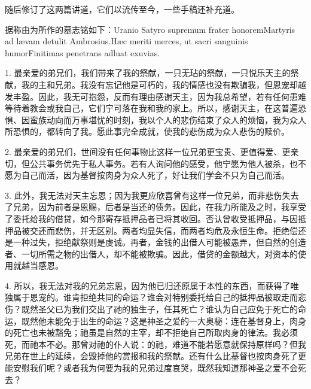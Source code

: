 随后修订了这两篇讲道，它们以流传至今，一些手稿还补充道。\par

据称由为所作的墓志铭如下：\newline{}Uranio Satyro supremum frater honorem\newline{}Martyris ad lævam detulit Ambrosius.\newline{}Hæc meriti merces, ut sacri sanguinis humor\newline{}Finitimas penetrans adluat exuvias.\par


1. 最亲爱的弟兄们，我们带来了我的祭献，一只无玷的祭献，一只悦乐天主的祭献，我的主和兄弟。我没有忘记他是可朽的，我的情感也没有欺骗我，但恩宠却越发丰盈。因此，我无可抱怨，反而有理由感谢天主，因为我总希望，若有任何患难等待着教会或我自己，它们宁可落在我和我的家上。所以，感谢天主，在这普遍恐惧、因蛮族动向而万事堪忧的时刻，我以个人的悲伤结束了众人的烦恼，我为众人所恐惧的，都转向了我。愿此事完全成就，使我的悲伤成为众人悲伤的赎价。\par

2. 最亲爱的弟兄们，世间没有任何事物比这样一位兄弟更宝贵、更值得爱、更亲切，但公共事务优先于私人事务。若有人询问他的感受，他宁愿为他人被杀，也不愿为自己而活，因为基督按肉身为众人死了，好让我们学会不只为自己而活。\par

3. 此外，我无法对天主忘恩；因为我更应欣喜曾有这样一位兄弟，而非悲伤失去了兄弟，因为前者是恩赐，后者是当还的债务。因此，在我力所能及之时，我享受了委托给我的借贷，如今那寄存抵押品者已将其收回。否认曾收受抵押品，与因抵押品被交还而悲伤，并无区别。两者均显失信，而两者均危及永恒生命。拒绝偿还是一种过失，拒绝献祭则是虔诚。再者，金钱的出借人可能被愚弄，但自然的创造者、一切所需之物的出借人，却不能被欺骗。因此，借贷的金额越大，对资本的使用就越当感恩。\par

4. 所以，我无法对我的兄弟忘恩，因为他已归还原属于本性的东西，而获得了唯独属于恩宠的。谁肯拒绝共同的命运？谁会对特别委托给自己的抵押品被取走而悲伤？既然圣父已为我们交出了祂的独生子，任其死亡？谁认为自己应免于死亡的命运，既然他未能免于出生的命运？这是神圣之爱的一大奥秘：连在基督身上，肉身的死亡也未被豁免；祂虽是自然的主宰，却不拒绝自己所取肉身的律法。我必须死，而祂本不必。那曾对祂的仆人说：的祂，难道不能若愿意就保持原样吗？但我兄弟在世上的延续，会毁掉他的赏报和我的祭献。还有什么比基督也按肉身死了更能安慰我们呢？或者我为何要为我的兄弟过度哀哭，既然我知道那神圣之爱不会死去？\par

